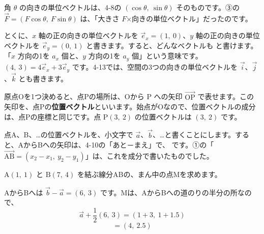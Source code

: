 角 $\theta$ の向きの単位ベクトルは、4-8の $(\cos\theta,\ \sin\theta)$ そのものです。③の $\vec{F}=(F\cos\theta,\ F\sin\theta)$ は、「大きさ $F$×向きの単位ベクトル」だったのです。

とくに、$x$ 軸の正の向きの単位ベクトルを $\vec{e}_x=(1,\ 0)$、$y$ 軸の正の向きの単位ベクトルを $\vec{e}_y=(0,\ 1)$ と書きます。すると、どんなベクトルも
と書けます。「$x$ 方向の1を $a_x$ 個と、$y$ 方向の1を $a_y$ 個」という意味です。$(4,\ 3)=4\vec{e}_x+3\vec{e}_y$ です。4-13では、空間の3つの向きの単位ベクトルを $\vec{i}$、$\vec{j}$、$\vec{k}$ とも書きます。


\label{bk:4-11:ichi}
原点Oを1つ決めると、点Pの場所は、Oから P への矢印 $\overrightarrow{\mathrm{OP}}$ で表せます。この矢印を、点Pの\textbf{位置ベクトル}といいます。始点がOなので、位置ベクトルの成分は、点Pの座標と同じです。点 $\mathrm{P}(3,\ 2)$ の位置ベクトルは $(3,\ 2)$ です。

点A、B、…の位置ベクトルを、小文字で $\vec{a}$、$\vec{b}$、…と書くことにします。すると、AからBへの矢印は、4-10の「あと－まえ」で、
です。①の「$\overrightarrow{\mathrm{AB}}=(x_2-x_1,\ y_2-y_1)$」は、これを成分で書いたものでした。

\noindent\begin{minipage}[c]{0.5\linewidth}\centering
{}
\end{minipage}\hfill
\begin{minipage}[c]{0.47\linewidth}\raggedright 
$\mathrm{A}(1,\ 1)$ と $\mathrm{B}(7,\ 4)$ を結ぶ線分ABの、まん中の点Mを求めます。\par\vspace{2pt}
AからBへは $\vec{b}-\vec{a}=(6,\ 3)$ です。Mは、AからBへの道のりの半分の所なので、
\[ \vec{a}+\frac{1}{2}(6,\ 3)=(1+3,\ 1+1.5) \]
\[ =(4,\ 2.5) \]
\end{minipage}

